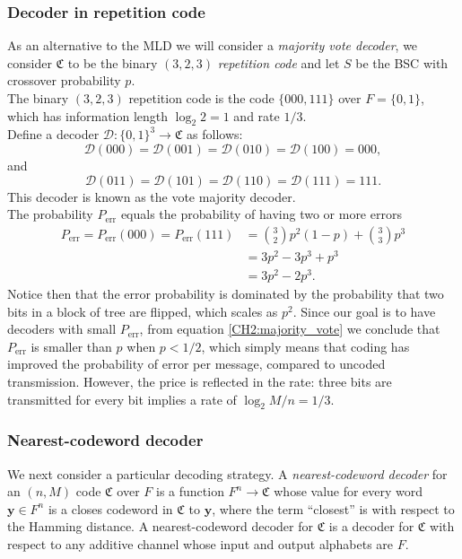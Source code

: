 \subsubsection*{Decoder in repetition code}
As an alternative to the MLD we will consider a \textit{majority vote decoder},  we consider $\mathfrak{C}$ to be the binary $(3,2,3)$ \textit{repetition code} and let $S$ be the BSC with crossover probability $p$.\\
\indent The binary $(3,2,3)$ repetition code is the code $\{000,111\}$ over $F=\{0,1\}$, which has information length $\log_2 2=1$ and rate $1/3$.\\
Define a decoder $\mathcal{D}:\{0,1\}^3\to \mathfrak{C}$ as follows:
\begin{equation}
\mathcal{D}(000)=\mathcal{D}(001)=\mathcal{D}(010)=\mathcal{D}(100) = 000,
\end{equation}
and
\begin{equation}
\mathcal{D}(011)=\mathcal{D}(101)=\mathcal{D}(110)=\mathcal{D}(111) = 111.
\end{equation}
This decoder is known as the vote majority decoder.\\
\indent The probability $P_{\text{err}}$ equals the probability of having two or more errors \cite{roth_2006}
\begin{align}
P_{\text{err}} = P_{\text{err}}(000) = P_{\text{err}}(111) &= {3 \choose 2}p^2(1-p) + {3 \choose 3}p^3\nonumber\\
&=3p^2-3p^3+p^3\nonumber\\
&=3p^2-2p^3.
\label{CH2:majority_vote}
\end{align}
Notice then that the error probability is dominated by the probability that two bits in a block of tree are flipped, which scales as $p^2$. Since our goal is to have decoders with small $P_{\text{err}}$, from equation \eqref{CH2:majority_vote} we conclude that $P_{\text{err}}$ is smaller than $p$ when $p<1/2$, which simply means that coding has improved the probability of error per message, compared to uncoded transmission. However, the price is reflected in the rate: three bits are transmitted for every bit implies a rate of $\log_2 M/n = 1/3$.
\subsubsection*{Nearest-codeword decoder}
\indent We next consider a particular decoding strategy. A \textit{nearest-codeword decoder} for an $(n,M)$ code $\mathfrak{C}$ over $F$ is a function $F^n\to \mathfrak{C}$ whose value for every word $\mathbf{y}\in F^n$ is a closes codeword in $\mathfrak{C}$ to $\mathbf{y}$, where the term ``closest'' is with respect to the Hamming distance. A nearest-codeword decoder for $\mathfrak{C}$ is a decoder for $\mathfrak{C}$ with respect to any additive channel whose input and output alphabets are $F$.
